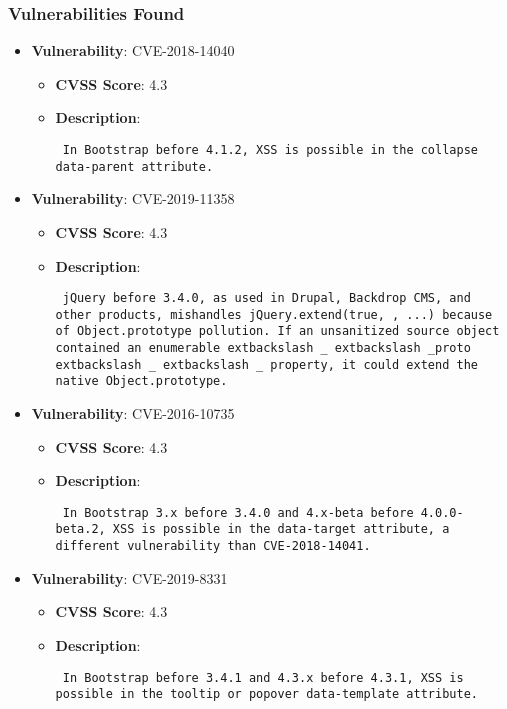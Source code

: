 \documentclass{article}
\begin{document}
\subsubsection*{Vulnerabilities Found}

\begin{itemize}
    
        \item \textbf{Vulnerability}: CVE-2018-14040
        \begin{itemize}
            \item \textbf{CVSS Score}:  4.3 
            \item \textbf{Description}: \parbox{\linewidth}{\texttt{ In Bootstrap before 4.1.2, XSS is possible in the collapse data-parent attribute. }}
        \end{itemize}
    
        \item \textbf{Vulnerability}: CVE-2019-11358
        \begin{itemize}
            \item \textbf{CVSS Score}:  4.3 
            \item \textbf{Description}: \parbox{\linewidth}{\texttt{ jQuery before 3.4.0, as used in Drupal, Backdrop CMS, and other products, mishandles jQuery.extend(true, {}, ...) because of Object.prototype pollution. If an unsanitized source object contained an enumerable 	extbackslash _	extbackslash _proto	extbackslash _	extbackslash _ property, it could extend the native Object.prototype. }}
        \end{itemize}
    
        \item \textbf{Vulnerability}: CVE-2016-10735
        \begin{itemize}
            \item \textbf{CVSS Score}:  4.3 
            \item \textbf{Description}: \parbox{\linewidth}{\texttt{ In Bootstrap 3.x before 3.4.0 and 4.x-beta before 4.0.0-beta.2, XSS is possible in the data-target attribute, a different vulnerability than CVE-2018-14041. }}
        \end{itemize}
    
        \item \textbf{Vulnerability}: CVE-2019-8331
        \begin{itemize}
            \item \textbf{CVSS Score}:  4.3 
            \item \textbf{Description}: \parbox{\linewidth}{\texttt{ In Bootstrap before 3.4.1 and 4.3.x before 4.3.1, XSS is possible in the tooltip or popover data-template attribute. }}
        \end{itemize}
    

\end{itemize}
\end{document}
